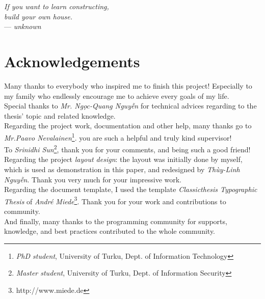 

\begin{flushright}{\slshape    
If you want to learn constructing, \\
build your own house.} \\ \medskip
--- \emph{unknown}
\end{flushright}

\bigskip


\begingroup

\let\clearpage\relax
\let\cleardoublepage\relax
\let\cleardoublepage\relax

\chapter*{Acknowledgements} %

\noindent Many thanks to everybody who inspired me to finish this project! 
Especially to my family who endlessly encourage me to achieve every goals of my life.  \\

\noindent Special thanks to \emph{Mr. Ng\d{o}c-Quang Nguy\~{\^{e}}n} for technical advices regarding to the thesis' topic and related knowledge. \\

\noindent Regarding the project work, documentation and other help, many thanks go to \emph{Mr.Paavo Nevalainen}\footnote{\emph{PhD student}, University of Turku,  Dept. of Information Technology}. you are such a helpful and truly kind supervisor! \\

\noindent To \emph{Srinidhi Sun}\footnote{\emph{Master student}, University of Turku,  Dept. of Information Security}, thank you for your comments, and being such a good friend! \\

\noindent Regarding the project \emph{layout design}: the layout was initially done by myself, which is used as demonstration in this paper, and redesigned by \emph{Th\`{u}y-Linh Nguy\~{\^{e}}n}.
Thank you very much for your impressive work.\\

\noindent Regarding the document template, I used the \latex template \emph{Classicthesis Typographic Thesis} of \emph{Andr\'{e} Miede}\footnote{http://www.miede.de}.
Thank you for your work and contributions to \latex community.\\

\noindent And finally, many thanks to the programming community for supports, knowledge, and best practices contributed to the whole community.

\endgroup
